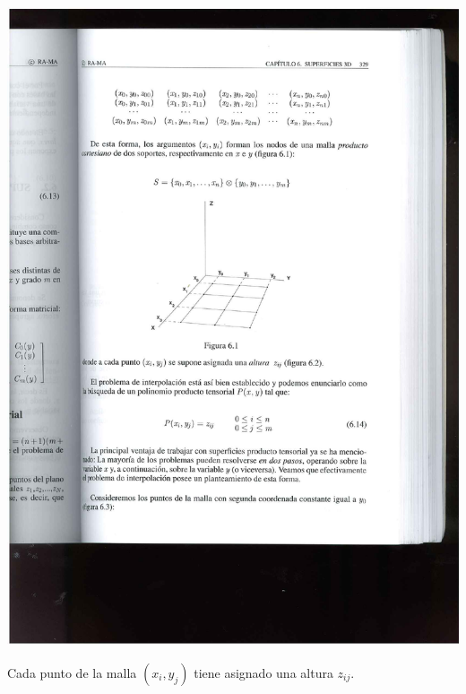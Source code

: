 \documentclass[ebook,oneside]{memoir}
\begin{document}
\begin{center}
\includegraphics[scale=0.55]{6_1.pdf}
\end{center}

Cada punto de la malla $(x_i,y_j)$ tiene asignado una altura $z_{ij}$.
\end{document}
